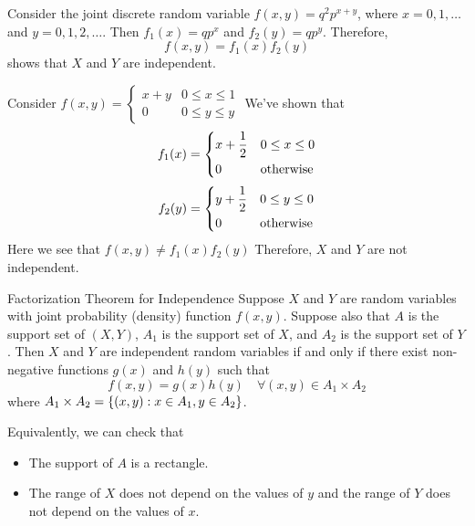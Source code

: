 \begin{Example}{}{}
    Consider the joint discrete random variable
    $ f(x,y)=q^2 p^{x+y} $, where $ x=0,1,\ldots $
    and $ y=0,1,2,\ldots $. Then $ f_1(x)=qp^x $
    and $ f_2(y)=qp^y $. Therefore,
    \[ f(x,y)=f_1(x)f_2(y) \]
    shows that $ X $ and $ Y $ are independent.

    Consider $ \displaystyle
        f(x,y)=\begin{cases}
            x+y & 0\le x\le 1 \\
            0   & 0\le y\le y
        \end{cases} $
    We've shown that
    \[ f_1(x)=\begin{dcases}
            x+\frac{1}{2} & 0\le x\le 0      \\
            0             & \text{otherwise}
        \end{dcases} \]
    \[ f_2(y)=\begin{dcases}
            y+\frac{1}{2} & 0\le y\le 0      \\
            0             & \text{otherwise}
        \end{dcases} \]
    Here we see that $ f(x,y)\neq f_1(x)f_2(y) $
    Therefore, $ X $ and $ Y $ are not independent.
\end{Example}

\begin{Theorem}{Factorization Theorem for Independence}{}
    Suppose $ X $ and $ Y $ are random variables
    with joint probability (density) function $ f(x,y) $. Suppose
    also that $ A $ is the support set of $ (X,Y) $,
    $ A_1 $ is the support set of $ X $,
    and $ A_2 $ is the support set of $ Y $. Then
    $ X $ and $ Y $ are independent random variables
    if and only if there exist non-negative functions
    $ g(x) $ and $ h(y) $ such that
    \[ f(x,y)=g(x)h(y)\quad\forall(x,y)\in A_1\times A_2 \]
    where $ A_1\times A_2=\{(x,y):x\in A_1,y\in A_2\} $.
\end{Theorem}
\begin{Remark}{}{}
    Equivalently, we can check that
    \begin{itemize}
        \item The support of $ A $ is a rectangle.
        \item The range of $ X $ does not depend on the values
              of $ y $ and the range of $ Y $ does not depend on the values of $ x $.
    \end{itemize}
\end{Remark}

